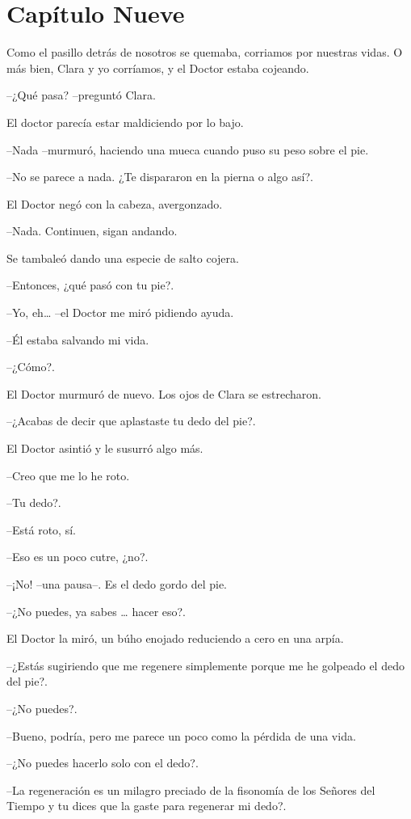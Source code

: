\chapter*{Capítulo Nueve}

Como el pasillo detrás de nosotros se quemaba, corriamos por nuestras
vidas. O más bien, Clara y yo corríamos, y el Doctor estaba cojeando.

--¿Qué pasa? --preguntó Clara.

El doctor parecía estar maldiciendo por lo bajo.

--Nada --murmuró, haciendo una mueca cuando puso su peso sobre el pie.

--No se parece a nada. ¿Te dispararon en la pierna o algo así?.

El Doctor negó con la cabeza, avergonzado.

--Nada. Continuen, sigan andando.

Se tambaleó dando una especie de salto cojera.

--Entonces, ¿qué pasó con tu pie?.

--Yo, eh\ldots{} --el Doctor me miró pidiendo ayuda.

--Él estaba salvando mi vida.

--¿Cómo?.

El Doctor murmuró de nuevo. Los ojos de Clara se estrecharon.

--¿Acabas de decir que aplastaste tu dedo del pie?.

El Doctor asintió y le susurró algo más.

--Creo que me lo he roto.

--Tu dedo?.

--Está roto, sí.

--Eso es un poco cutre, ¿no?.

--¡No! --una pausa--. Es el dedo gordo del pie.

--¿No puedes, ya sabes \ldots{} hacer eso?.

El Doctor la miró, un búho enojado reduciendo a cero en una arpía.

--¿Estás sugiriendo que me regenere simplemente porque me he golpeado
el dedo del pie?.

--¿No puedes?.

--Bueno, podría, pero me parece un poco como la pérdida de una vida.

--¿No puedes hacerlo solo con el dedo?.

--La regeneración es un milagro preciado de la fisonomía de los Señores
del Tiempo y tu dices que la gaste para regenerar mi dedo?.

